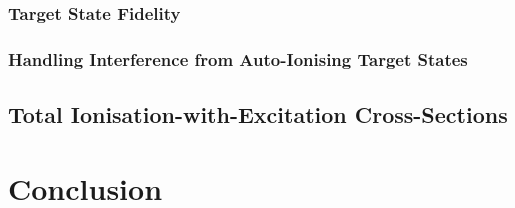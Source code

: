 \documentclass[draft]{article}
\begin{document}
\subsubsection{Target State Fidelity}
\label{sec:target-state-fidelity}

\subsubsection{Handling Interference from Auto-Ionising Target States}
\label{sec:handling-auto-ion-states}

\subsection{Total Ionisation-with-Excitation Cross-Sections}
\label{sec:tiecs}

\section{Conclusion}
\label{sec:conclusion}
\end{document}
